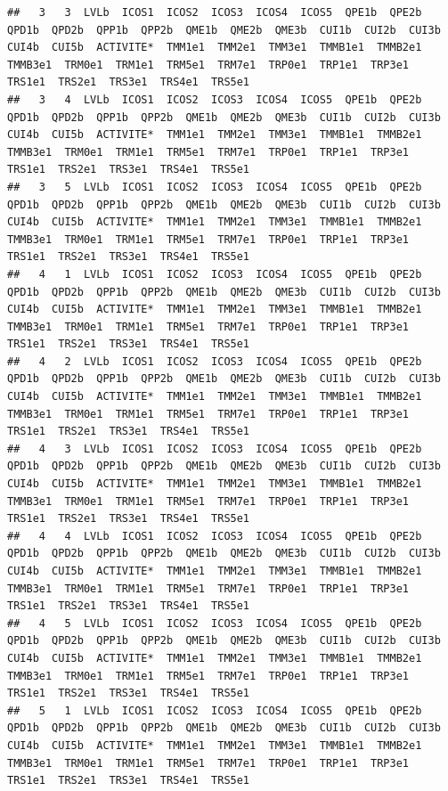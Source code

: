 \documentclass[11pt,a4paper, x11names]{article}\usepackage[]{graphicx}\usepackage[]{color}
\makeatletter
\newenvironment{kframe}{%
 \def\at@end@of@kframe{}%
 \ifinner\ifhmode%
  \def\at@end@of@kframe{\end{minipage}}%
  \begin{minipage}{\columnwidth}%
 \fi\fi%
 \def\FrameCommand##1{\hskip\@totalleftmargin \hskip-\fboxsep
 \colorbox{shadecolor}{##1}\hskip-\fboxsep
     \hskip-\linewidth \hskip-\@totalleftmargin \hskip\columnwidth}%
 \MakeFramed {\advance\hsize-\width
   \@totalleftmargin\z@ \linewidth\hsize
   \@setminipage}}%
 {\par\unskip\endMakeFramed%
 \at@end@of@kframe}
\newenvironment{knitrout}{}{} %
\makeatother
\begin{document}
\begin{knitrout}
\begin{kframe}
\begin{verbatim}
##   3   3  LVLb  ICOS1  ICOS2  ICOS3  ICOS4  ICOS5  QPE1b  QPE2b  QPD1b  QPD2b  QPP1b  QPP2b  QME1b  QME2b  QME3b  CUI1b  CUI2b  CUI3b  CUI4b  CUI5b  ACTIVITE*  TMM1e1  TMM2e1  TMM3e1  TMMB1e1  TMMB2e1  TMMB3e1  TRM0e1  TRM1e1  TRM5e1  TRM7e1  TRP0e1  TRP1e1  TRP3e1  TRS1e1  TRS2e1  TRS3e1  TRS4e1  TRS5e1
##   3   4  LVLb  ICOS1  ICOS2  ICOS3  ICOS4  ICOS5  QPE1b  QPE2b  QPD1b  QPD2b  QPP1b  QPP2b  QME1b  QME2b  QME3b  CUI1b  CUI2b  CUI3b  CUI4b  CUI5b  ACTIVITE*  TMM1e1  TMM2e1  TMM3e1  TMMB1e1  TMMB2e1  TMMB3e1  TRM0e1  TRM1e1  TRM5e1  TRM7e1  TRP0e1  TRP1e1  TRP3e1  TRS1e1  TRS2e1  TRS3e1  TRS4e1  TRS5e1
##   3   5  LVLb  ICOS1  ICOS2  ICOS3  ICOS4  ICOS5  QPE1b  QPE2b  QPD1b  QPD2b  QPP1b  QPP2b  QME1b  QME2b  QME3b  CUI1b  CUI2b  CUI3b  CUI4b  CUI5b  ACTIVITE*  TMM1e1  TMM2e1  TMM3e1  TMMB1e1  TMMB2e1  TMMB3e1  TRM0e1  TRM1e1  TRM5e1  TRM7e1  TRP0e1  TRP1e1  TRP3e1  TRS1e1  TRS2e1  TRS3e1  TRS4e1  TRS5e1
##   4   1  LVLb  ICOS1  ICOS2  ICOS3  ICOS4  ICOS5  QPE1b  QPE2b  QPD1b  QPD2b  QPP1b  QPP2b  QME1b  QME2b  QME3b  CUI1b  CUI2b  CUI3b  CUI4b  CUI5b  ACTIVITE*  TMM1e1  TMM2e1  TMM3e1  TMMB1e1  TMMB2e1  TMMB3e1  TRM0e1  TRM1e1  TRM5e1  TRM7e1  TRP0e1  TRP1e1  TRP3e1  TRS1e1  TRS2e1  TRS3e1  TRS4e1  TRS5e1
##   4   2  LVLb  ICOS1  ICOS2  ICOS3  ICOS4  ICOS5  QPE1b  QPE2b  QPD1b  QPD2b  QPP1b  QPP2b  QME1b  QME2b  QME3b  CUI1b  CUI2b  CUI3b  CUI4b  CUI5b  ACTIVITE*  TMM1e1  TMM2e1  TMM3e1  TMMB1e1  TMMB2e1  TMMB3e1  TRM0e1  TRM1e1  TRM5e1  TRM7e1  TRP0e1  TRP1e1  TRP3e1  TRS1e1  TRS2e1  TRS3e1  TRS4e1  TRS5e1
##   4   3  LVLb  ICOS1  ICOS2  ICOS3  ICOS4  ICOS5  QPE1b  QPE2b  QPD1b  QPD2b  QPP1b  QPP2b  QME1b  QME2b  QME3b  CUI1b  CUI2b  CUI3b  CUI4b  CUI5b  ACTIVITE*  TMM1e1  TMM2e1  TMM3e1  TMMB1e1  TMMB2e1  TMMB3e1  TRM0e1  TRM1e1  TRM5e1  TRM7e1  TRP0e1  TRP1e1  TRP3e1  TRS1e1  TRS2e1  TRS3e1  TRS4e1  TRS5e1
##   4   4  LVLb  ICOS1  ICOS2  ICOS3  ICOS4  ICOS5  QPE1b  QPE2b  QPD1b  QPD2b  QPP1b  QPP2b  QME1b  QME2b  QME3b  CUI1b  CUI2b  CUI3b  CUI4b  CUI5b  ACTIVITE*  TMM1e1  TMM2e1  TMM3e1  TMMB1e1  TMMB2e1  TMMB3e1  TRM0e1  TRM1e1  TRM5e1  TRM7e1  TRP0e1  TRP1e1  TRP3e1  TRS1e1  TRS2e1  TRS3e1  TRS4e1  TRS5e1
##   4   5  LVLb  ICOS1  ICOS2  ICOS3  ICOS4  ICOS5  QPE1b  QPE2b  QPD1b  QPD2b  QPP1b  QPP2b  QME1b  QME2b  QME3b  CUI1b  CUI2b  CUI3b  CUI4b  CUI5b  ACTIVITE*  TMM1e1  TMM2e1  TMM3e1  TMMB1e1  TMMB2e1  TMMB3e1  TRM0e1  TRM1e1  TRM5e1  TRM7e1  TRP0e1  TRP1e1  TRP3e1  TRS1e1  TRS2e1  TRS3e1  TRS4e1  TRS5e1
##   5   1  LVLb  ICOS1  ICOS2  ICOS3  ICOS4  ICOS5  QPE1b  QPE2b  QPD1b  QPD2b  QPP1b  QPP2b  QME1b  QME2b  QME3b  CUI1b  CUI2b  CUI3b  CUI4b  CUI5b  ACTIVITE*  TMM1e1  TMM2e1  TMM3e1  TMMB1e1  TMMB2e1  TMMB3e1  TRM0e1  TRM1e1  TRM5e1  TRM7e1  TRP0e1  TRP1e1  TRP3e1  TRS1e1  TRS2e1  TRS3e1  TRS4e1  TRS5e1

\end{verbatim}
\end{kframe}
\end{knitrout}
\end{document}
